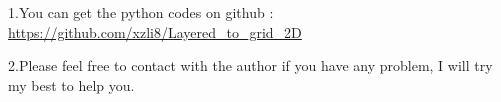 %
%
%
%
%

1.You can get the python codes on github :
\url{https://github.com/xzli8/Layered\_to\_grid\_2D} \par
2.Please feel free to contact with the author if you have any problem, 
I will try my best to help you.
